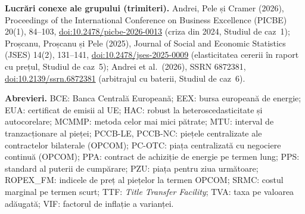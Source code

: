 {\vspace{0.3cm}
{\footnotesize{}%
{\textbf{Lucrări conexe ale grupului (trimiteri).} Andrei, Pele și Cramer (2026), Proceedings of the International Conference on Business Excellence (PICBE) 20(1), 84--103, \href{https://doi.org/10.2478/picbe-2026-0013}{doi:10.2478/picbe-2026-0013} (criza din 2024, Studiul de caz~1);
Proșcanu, Proșcanu și Pele (2025), Journal of Social and Economic Statistics (JSES) 14(2), 131--141, \href{https://doi.org/10.2478/jses-2025-0009}{doi:10.2478/jses-2025-0009} (elasticitatea cererii în raport cu prețul, Studiul de caz~5);
Andrei et al.\ (2026), SSRN 6872381, \href{https://doi.org/10.2139/ssrn.6872381}{doi:10.2139/ssrn.6872381} (arbitrajul cu baterii, Studiul de caz~6).}}}\par
\vspace{0.3cm}
{\scriptsize\color{FooterGray}%
{\textbf{Abrevieri.} BCE: Banca Centrală Europeană; EEX: bursa europeană de energie; EUA: certificat de emisii al UE; HAC: robust la heteroscedasticitate și autocorelare; MCMMP: metoda celor mai mici pătrate; MTU: interval de tranzacționare al pieței; PCCB-LE, PCCB-NC: piețele centralizate ale contractelor bilaterale (OPCOM); PC-OTC: piața centralizată cu negociere continuă (OPCOM); PPA: contract de achiziție de energie pe termen lung; PPS: standard al puterii de cumpărare; PZU: piața pentru ziua următoare; ROPEX\_FM: indicele de preț al piețelor la termen OPCOM; SRMC: costul marginal pe termen scurt; TTF: \emph{Title Transfer Facility}; TVA: taxa pe valoarea adăugată; VIF: factorul de inflație a varianței.}}

